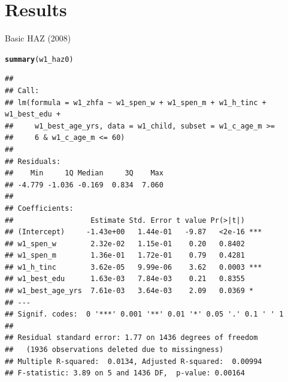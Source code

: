 \documentclass[a4paper]{book}\usepackage{graphicx, color}
\makeatletter
\newcommand{\hlfunctioncall}[1]{\textcolor[rgb]{0.501960784313725,0,0.329411764705882}{\textbf{#1}}}%
\newenvironment{kframe}{%
 \def\at@end@of@kframe{}%
 \ifinner\ifhmode%
  \def\at@end@of@kframe{\end{minipage}}%
  \begin{minipage}{\columnwidth}%
 \fi\fi%
 \def\FrameCommand##1{\hskip\@totalleftmargin \hskip-\fboxsep
 \colorbox{shadecolor}{##1}\hskip-\fboxsep
     \hskip-\linewidth \hskip-\@totalleftmargin \hskip\columnwidth}%
 \MakeFramed {\advance\hsize-\width
   \@totalleftmargin\z@ \linewidth\hsize
   \@setminipage}}%
 {\par\unskip\endMakeFramed%
 \at@end@of@kframe}
\newenvironment{knitrout}{}{} %
\makeatother
\begin{document}
\section{Results}

Basic HAZ (2008)

\begin{knitrout}
\color{fgcolor}\begin{kframe}
\begin{alltt}
\hlfunctioncall{summary}(w1_haz0)
\end{alltt}
\begin{verbatim}
## 
## Call:
## lm(formula = w1_zhfa ~ w1_spen_w + w1_spen_m + w1_h_tinc + w1_best_edu + 
##     w1_best_age_yrs, data = w1_child, subset = w1_c_age_m >= 
##     6 & w1_c_age_m <= 60)
## 
## Residuals:
##    Min     1Q Median     3Q    Max 
## -4.779 -1.036 -0.169  0.834  7.060 
## 
## Coefficients:
##                  Estimate Std. Error t value Pr(>|t|)    
## (Intercept)     -1.43e+00   1.44e-01   -9.87   <2e-16 ***
## w1_spen_w        2.32e-02   1.15e-01    0.20   0.8402    
## w1_spen_m        1.36e-01   1.72e-01    0.79   0.4281    
## w1_h_tinc        3.62e-05   9.99e-06    3.62   0.0003 ***
## w1_best_edu      1.63e-03   7.84e-03    0.21   0.8355    
## w1_best_age_yrs  7.61e-03   3.64e-03    2.09   0.0369 *  
## ---
## Signif. codes:  0 '***' 0.001 '**' 0.01 '*' 0.05 '.' 0.1 ' ' 1
## 
## Residual standard error: 1.77 on 1436 degrees of freedom
##   (1936 observations deleted due to missingness)
## Multiple R-squared:  0.0134,	Adjusted R-squared:  0.00994 
## F-statistic: 3.89 on 5 and 1436 DF,  p-value: 0.00164
\end{verbatim}
\end{kframe}
\end{knitrout}
\end{document}
